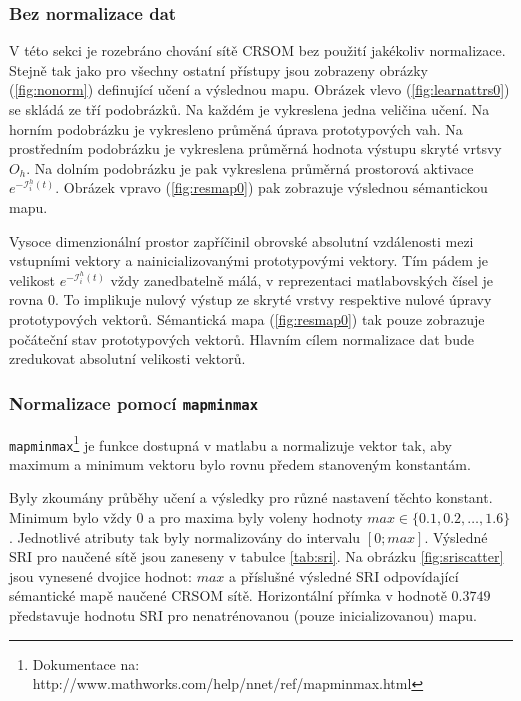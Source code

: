 \documentclass[thesis=M,czech]{FITthesis}[2012/06/26]
\begin{document}
\subsubsection*{Bez normalizace dat}\label{sec:nonorm}

V této sekci je rozebráno chování sítě CRSOM bez použití jakékoliv normalizace. Stejně tak jako pro všechny ostatní přístupy jsou zobrazeny obrázky (\ref{fig:nonorm}) definující učení a výslednou mapu. Obrázek vlevo (\ref{fig:learnattrs0}) se skládá ze tří podobrázků. Na každém je vykreslena jedna veličina učení. Na horním podobrázku je vykresleno průměná úprava prototypových vah. Na prostředním podobrázku je vykreslena průměrná hodnota výstupu skryté vrtsvy $O_h$. Na dolním podobrázku je pak vykreslena průměrná prostorová aktivace $e^{-\mathcal{I}_i^h(t)}$. Obrázek vpravo (\ref{fig:resmap0}) pak zobrazuje výslednou sémantickou mapu.



Vysoce dimenzionální prostor zapříčinil obrovské absolutní vzdálenosti mezi vstupními vektory a nainicializovanými prototypovými vektory. Tím pádem je velikost $e^{-\mathcal{I}_i^h(t)}$ vždy zanedbatelně málá, v reprezentaci matlabovských čísel je rovna $0$. To implikuje nulový výstup ze skryté vrstvy respektive nulové úpravy prototypových vektorů. Sémantická mapa (\ref{fig:resmap0}) tak pouze zobrazuje počáteční stav prototypových vektorů. Hlavním cílem normalizace dat bude zredukovat absolutní velikosti vektorů.




\subsubsection*{Normalizace pomocí \texttt{mapminmax}}
\texttt{mapminmax}\footnote{Dokumentace na: http://www.mathworks.com/help/nnet/ref/mapminmax.html} je funkce dostupná v matlabu a normalizuje vektor tak, aby maximum a minimum vektoru bylo rovnu předem stanoveným konstantám.



Byly zkoumány průběhy učení a výsledky pro různé nastavení těchto konstant. Minimum bylo vždy $0$ a pro maxima byly voleny hodnoty $max\in\{0.1, 0.2, \dots, 1.6\}$. Jednotlivé atributy tak byly normalizovány do intervalu $[0; max]$.  Výsledné SRI pro naučené sítě jsou zaneseny v tabulce \ref{tab:sri}. Na obrázku \ref{fig:sriscatter} jsou vynesené dvojice hodnot: $max$ a příslušné výsledné SRI odpovídající sémantické mapě naučené CRSOM sítě. Horizontální přímka v hodnotě $0.3749$ představuje hodnotu SRI pro nenatrénovanou (pouze inicializovanou) mapu. 
\end{document}
